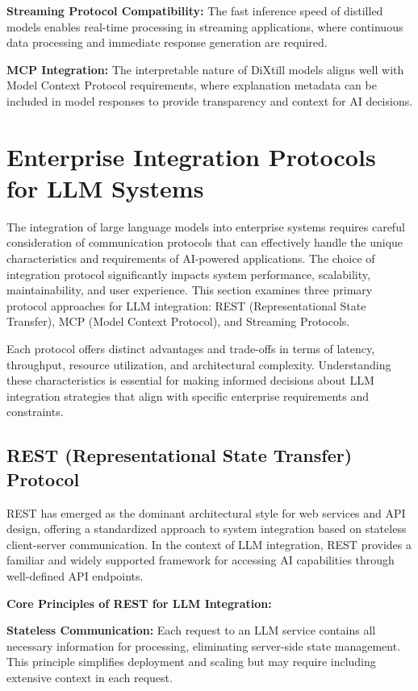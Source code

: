 \textbf{Streaming Protocol Compatibility:} The fast inference speed of distilled models enables real-time processing in streaming applications, where continuous data processing and immediate response generation are required.

\textbf{MCP Integration:} The interpretable nature of DiXtill models aligns well with Model Context Protocol requirements, where explanation metadata can be included in model responses to provide transparency and context for AI decisions.

\section{Enterprise Integration Protocols for LLM Systems}

The integration of large language models into enterprise systems requires careful consideration of communication protocols that can effectively handle the unique characteristics and requirements of AI-powered applications. The choice of integration protocol significantly impacts system performance, scalability, maintainability, and user experience. This section examines three primary protocol approaches for LLM integration: REST (Representational State Transfer), MCP (Model Context Protocol), and Streaming Protocols.

Each protocol offers distinct advantages and trade-offs in terms of latency, throughput, resource utilization, and architectural complexity. Understanding these characteristics is essential for making informed decisions about LLM integration strategies that align with specific enterprise requirements and constraints.

\subsection{REST (Representational State Transfer) Protocol}

REST has emerged as the dominant architectural style for web services and API design, offering a standardized approach to system integration based on stateless client-server communication. In the context of LLM integration, REST provides a familiar and widely supported framework for accessing AI capabilities through well-defined API endpoints.

\textbf{Core Principles of REST for LLM Integration:}

\textbf{Stateless Communication:} Each request to an LLM service contains all necessary information for processing, eliminating server-side state management. This principle simplifies deployment and scaling but may require including extensive context in each request.

